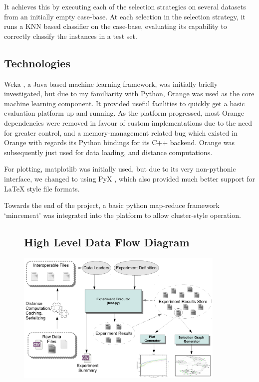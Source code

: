 \documentclass[a4paper,11pt]{report}
\begin{document}
It achieves this by executing each of the selection strategies on several datasets from an initially empty case-base. At each selection in the selection strategy, it runs a KNN based classifier on the case-base, evaluating its capability to correctly classify the instances in a test set.

\subsection{Technologies}
Weka \citep{prog:weka}, a Java based machine learning framework, was initially briefly investigated, but due to my familiarity with Python, Orange \citep{prog:orange} was used as the core machine learning component. It provided useful facilities to quickly get a basic evaluation platform up and running. As the platform progressed, most Orange dependencies were removed in favour of custom implementations due to the need for greater control, and a memory-management related bug which existed in Orange with regards its Python bindings for its C++ backend. Orange was subsequently just used for data loading, and distance computations.

For plotting, matplotlib \citep{prog:matplotlib} was initially used, but due to its very non-pythonic interface, we changed to using PyX \citep{prog:pyx}, which also provided much better support for \LaTeX{} style file formats.

Towards the end of the project, a basic python map-reduce framework `mincemeat' \citep{prog:mincemeat} was integrated into the platform to allow cluster-style operation.

\begin{figure}[h!]
\subsection{High Level Data Flow Diagram}
 \centering
\includegraphics[width=10cm]{./Drawn/DataFlowDiagram}
\end{figure}
\end{document}
